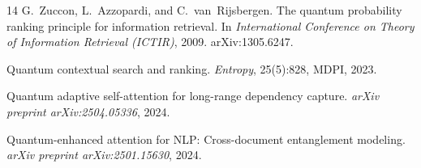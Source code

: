 \documentclass[11pt,letterpaper]{article}
\begin{document}
\begin{thebibliography}{14}
G.~Zuccon, L.~Azzopardi, and C.~van~Rijsbergen.
\newblock The quantum probability ranking principle for information
  retrieval.
\newblock In \emph{International Conference on Theory of Information
  Retrieval (ICTIR)}, 2009.
\newblock arXiv:1305.6247.

Quantum contextual search and ranking.
\newblock \emph{Entropy}, 25(5):828, MDPI, 2023.

Quantum adaptive self-attention for long-range dependency capture.
\newblock \emph{arXiv preprint arXiv:2504.05336}, 2024.

Quantum-enhanced attention for {NLP}: Cross-document entanglement modeling.
\newblock \emph{arXiv preprint arXiv:2501.15630}, 2024.

\end{thebibliography}
\end{document}
